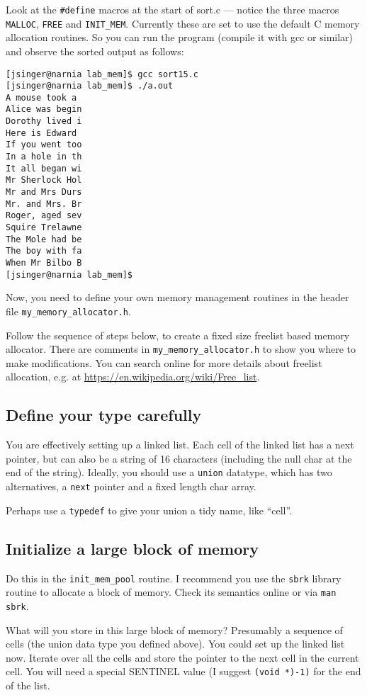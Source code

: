 \documentclass{article}
\begin{document}
Look at the \lstinline|#define| macros at the start of sort.c ---
notice the three macros \lstinline|MALLOC|, \lstinline|FREE| and
\lstinline|INIT_MEM|. Currently these are set to use the
default C memory allocation routines. So you can run the program
(compile it with gcc or similar) and observe the sorted output
as follows:
\begin{lstlisting}
[jsinger@narnia lab_mem]$ gcc sort15.c
[jsinger@narnia lab_mem]$ ./a.out
A mouse took a 
Alice was begin
Dorothy lived i
Here is Edward 
If you went too
In a hole in th
It all began wi
Mr Sherlock Hol
Mr and Mrs Durs
Mr. and Mrs. Br
Roger, aged sev
Squire Trelawne
The Mole had be
The boy with fa
When Mr Bilbo B
[jsinger@narnia lab_mem]$ 
\end{lstlisting}

Now, you need to define your own memory management routines
in the header file \lstinline|my_memory_allocator.h|.

Follow the sequence of steps below, to create
a fixed size freelist based memory allocator.
There are comments in \lstinline|my_memory_allocator.h|
to show you where to make modifications.
You can search online for more details about
freelist allocation, e.g.
at \url{https://en.wikipedia.org/wiki/Free_list}.

\subsection{Define your type carefully}

You are effectively setting up a linked list.
Each cell of the linked list has a next pointer,
but can also be a string of 16 characters
(including the null char at the end of the string).
Ideally, you should use a \lstinline|union| datatype,
which has two alternatives, a \lstinline|next| pointer
and a fixed length char array.

Perhaps use a \lstinline|typedef| to give your union a tidy name,
like ``cell''.

\subsection{Initialize a large block of memory}

Do this in the \lstinline|init_mem_pool| routine.
I recommend you use the \lstinline|sbrk| library routine
to allocate a block of memory. Check its semantics online or
via \lstinline|man sbrk|.

What will you store in this large block of memory?
Presumably a sequence of cells (the union data type you
defined above).
You could set up the linked list now. Iterate over all the
cells and store the pointer to the next cell in the current cell.
You will need a special SENTINEL value (I suggest
\lstinline|(void *)-1)| for
the end of the list.
\end{document}
